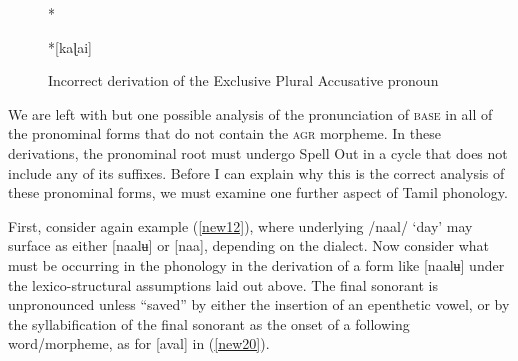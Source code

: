 \documentclass[output=paper]{langscibook}
\begin{document}
\begin{figure}
    \centering
    \begin{minipage}[t][][t]{.1\textwidth}
        *
    \end{minipage}
    \begin{minipage}[t]{.45\textwidth}
    \end{minipage}
    \begin{minipage}[t][][c]{.1\textwidth}
        \rightarrow 
    \end{minipage}
    \begin{minipage}[t]{.2\textwidth}
        *[kaɭai]
    \end{minipage}
    \caption{Incorrect derivation of the Exclusive Plural Accusative pronoun }
    \label{new19}
\end{figure}

We are left with but one possible analysis of the pronunciation of \textsc{base} in all of the pronominal forms that do not contain the \textsc{agr} morpheme. In these derivations, the pronominal root must undergo Spell Out in a cycle that does not include any of its suffixes. Before I can explain why this is the correct analysis of these pronominal forms, we must examine one further aspect of Tamil phonology.\largerpage

First, consider again example (\ref{new12}), where underlying /naal/ ‘day’ may surface as either  [naalʉ] or [naa], depending on the dialect. Now consider what must be occurring in the phonology in the derivation of a form like [naalʉ] under the lexico-structural assumptions laid out above. The final sonorant is unpronounced unless “saved” by either the insertion of an epenthetic vowel, or by the syllabification of the final sonorant as the onset of a following word/morpheme, as for [aval] in (\ref{new20}).
\end{document}
